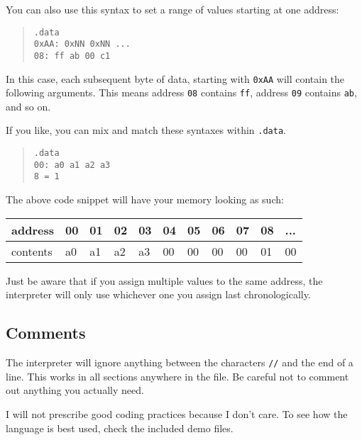 \documentclass[12pt, oneside]{memoir}
\newcommand{\header}[1]{{\color{header}\texttt{#1}}}
\begin{document}
You can also use this syntax to set a range of values starting at one address:

\begin{quotation}\texttt{\header{.data}\\
    {\color{imm}0xAA}: {\color{imm}0xNN} {\color{imm}0xNN} ...\\
    {\color{imm}08}: {\color{imm}ff} {\color{imm}ab} {\color{imm}00} {\color{imm}c1}
}\end{quotation}

In this case, each subsequent byte of data, starting with \texttt{{\color{imm}0xAA}} will contain the following arguments. This means address \texttt{{\color{imm}08}} contains \texttt{{\color{imm}ff}}, address \texttt{{\color{imm}09}} contains \texttt{{\color{imm}ab}}, and so on.

If you like, you can mix and match these syntaxes within \header{.data}.
\begin{quotation}\texttt{\header{.data}\\
    {\color{imm}00}: {\color{imm}a0} {\color{imm}a1} {\color{imm}a2} {\color{imm}a3}\\
    {\color{imm}8} = {\color{imm}1}
}\end{quotation}
The above code snippet will have your memory looking as such:
\begin{table}[H]
    \begin{tabular}{|l|l|l|l|l|l|l|l|l|l|l|}
    \hline
    address  & 00 & 01 & 02 & 03 & 04 & 05 & 06 & 07 & 08 & ... \\ \hline
    contents & a0 & a1 & a2 & a3 & 00 & 00 & 00 & 00 & 01 & 00  \\ \hline
    \end{tabular}
\end{table}

Just be aware that if you assign multiple values to the same address, the interpreter will only use whichever one you assign last chronologically.

\subsection{Comments}
The interpreter will ignore anything between the characters \texttt{//} and the end of a line. This works in all sections anywhere in the file. Be careful not to comment out anything you actually need.\linebreak\linebreak

I will not prescribe good coding practices because I don't care. To see how the language is best used, check the included demo files.
\end{document}
